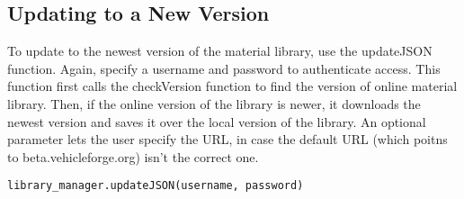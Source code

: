 \documentclass[letter]{article}
\begin{document}
\subsection{Updating to a New Version}
To update to the newest version of the material library, use the updateJSON function. Again, specify a username and password to authenticate access. This function first calls the checkVersion function to find the version of online material library. Then, if the online version of the library is newer, it downloads the newest version and saves it over the local version of the library. An optional parameter lets the user specify the URL, in case the default URL (which poitns to beta.vehicleforge.org) isn't the correct one.

\begin{lstlisting}
library_manager.updateJSON(username, password)
\end{lstlisting}
\end{document}
